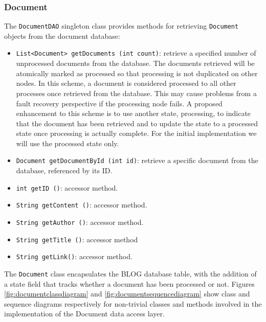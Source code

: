 \documentclass[10pt]{report}
\begin{document}
\subsubsection{Document}
\label{sec:document}
The \texttt{DocumentDAO} singleton class provides methods for retrieving
\texttt{Document} objects from the document database: 

\begin{itemize}
\item \texttt{List<Document> getDocuments (int count)}: retrieve a
  specified number of unprocessed documents from the database. The
  documents retrieved will be atomically marked as processed so that
  processing is not duplicated on other nodes. In this scheme, a
  document is considered processed to all other processes once
  retrieved from the database. This may cause problems from a fault
  recovery perspective if the processing node fails. A proposed
  enhancement to this scheme is to use another state, processing, to
  indicate that the document has been retrieved and to update the
  state to a processed state once processing is actually complete. For
  the initial implementation we will use the processed state only.

\item \texttt{Document getDocumentById (int id)}: retrieve a specific
  document from the database, referenced by its ID. 

\item \texttt{int getID ()}: accessor method.
\item \texttt{String getContent ()}: accessor method.
\item \texttt{String getAuthor ()}: accessor method.
\item \texttt{String getTitle ()}: accessor method
\item \texttt{String getLink()}: accessor method.
\end{itemize}

The \texttt{Document} class encapsulates the BLOG database table, with the
addition of a state field that tracks whether a document has been
processed or not. Figures \ref{fig:documentclassdiagram} and
\ref{fig:documentsequencediagram} show class and sequence diagrams
respectively for non-trivial classes and methods involved in the
implementation of the Document data access layer. 
\end{document}
